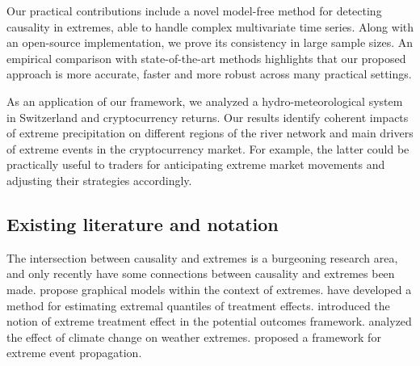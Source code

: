 \documentclass[a4paper,11pt]{article}
\begin{document}
Our practical contributions include a novel model-free method for detecting causality in extremes, able to handle complex multivariate time series. Along with an open-source implementation, we prove its consistency in large sample sizes. An empirical comparison with state-of-the-art methods \citep[such as PCMCI,][]{Runge2019PCMCI} highlights that our proposed approach is more accurate, faster and more robust across many practical settings. 

As an application of our framework, we analyzed a hydro-meteorological system in Switzerland and cryptocurrency returns. 
Our results identify coherent impacts of extreme precipitation on different regions of the river network and main drivers of extreme events in the cryptocurrency market.
For example, the latter could be practically useful to traders for anticipating extreme market movements and adjusting their strategies accordingly.



\subsection{Existing literature and notation}
The intersection between causality and extremes is a burgeoning research area, and only recently have some connections between causality and extremes been made. \cite{EngelkeGraphicalModels} propose graphical models within the context of extremes. \cite{Extremal_quantile_treatment_effect_Deuber_and_Engelke} have developed a method for estimating extremal quantiles of treatment effects. \cite{bodik2024extreme_treatment_effect} introduced the notion of extreme treatment effect in the potential outcomes framework.    \cite{Naveau} analyzed the effect of climate change on weather extremes. \cite{courgeau2021extreme} proposed a framework for extreme event propagation.  
\end{document}
